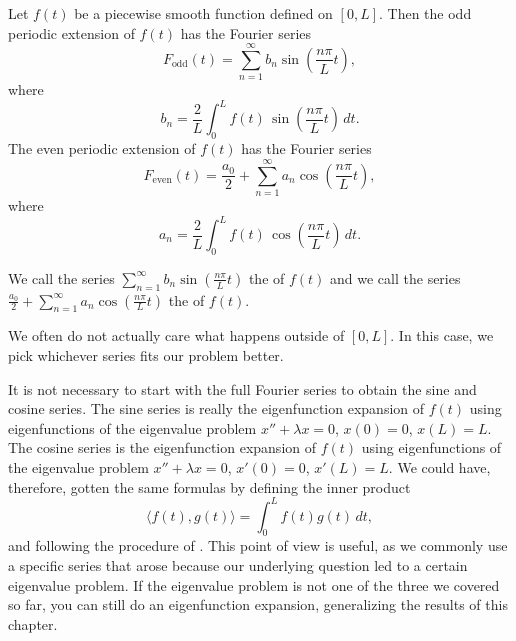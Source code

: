 \documentclass{ximera}
\begin{document}
\begin{theorem}{}
    Let $f(t)$ be a piecewise smooth function defined on $[0,L]$. Then the odd periodic extension of $f(t)$ has the Fourier series
    \begin{equation*}
        F_{\text{odd}}(t) = \sum_{n=1}^\infty b_n \sin \left( \frac{n \pi}{L} t \right) ,
    \end{equation*}
    where
    \begin{equation*}
        b_n = \frac{2}{L} \int_{0}^L f(t)\, \sin \left( \frac{n \pi}{L} t \right) \, dt .
    \end{equation*}
    The even periodic extension of $f(t)$ has the Fourier series
    \begin{equation*}
        F_{\text{even}}(t) = \frac{a_0}{2} + \sum_{n=1}^\infty a_n \cos \left(\frac{n \pi}{L} t \right) ,
    \end{equation*}
    where
    \begin{equation*}
        a_n = \frac{2}{L} \int_{0}^L f(t)\, \cos \left( \frac{n \pi}{L} t \right) \, dt .
    \end{equation*}
\end{theorem}

\begin{definition}
    We call the series $\sum_{n=1}^\infty b_n \sin \left( \frac{n \pi}{L} t\right)$ the \emph{} of $f(t)$ and we call the series
    $\frac{a_0}{2} + \sum_{n=1}^\infty a_n \cos \left( \frac{n \pi}{L} t \right)$ 
    the \emph{} of $f(t)$.  
\end{definition}
We often do not actually care what happens outside of $[0,L]$.  In this case, we pick whichever series fits our problem better.

It is not necessary to start with the full Fourier series to obtain the sine and cosine series. The sine series is really the eigenfunction expansion of $f(t)$ using  eigenfunctions of the eigenvalue problem $x''+\lambda x = 0$, $x(0) = 0$, $x(L) = L$.  The cosine series is the eigenfunction expansion of $f(t)$ using eigenfunctions of the eigenvalue problem $x''+\lambda x = 0$, $x'(0) = 0$, $x'(L) = L$.  We could have, therefore, gotten the same formulas by defining the inner product
\begin{equation*}
    \langle f(t), g(t) \rangle = \int_0^L f(t) g(t) \, dt ,
\end{equation*}
and following the procedure of .  This point of view is useful, as we commonly use a specific series that arose because our underlying question led to a certain eigenvalue problem.  If the eigenvalue problem is not one of the three we covered so far, you can still do an eigenfunction expansion, generalizing the results of this chapter.  %
\end{document}
